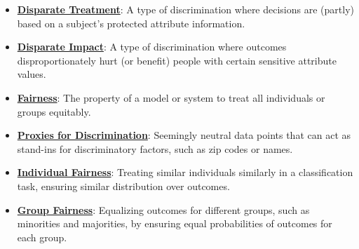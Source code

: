 \documentclass{article}%
\begin{document}
\begin{itemize}[leftmargin=*]%
\item \href{https://purdue.brightspace.com/d2l/common/assets/pdfjs-d2l-dist/1.0.14-legacy/web/viewer.html?file=\%2Fcontent\%2Fenforced\%2F1095467-wl.202510.CS.24300.001\%2F16L2-ethics.pdf\%3Fou\%3D1095467\&lang=en-us\&container=d2l-fileviewer-rendered-pdf\&fullscreen=d2l-fileviewer-rendered-pdf-dialog\&height=667#page=19}{\textbf{Disparate Treatment}}: A type of discrimination where decisions are (partly) based on a subject's protected attribute information.%
\item \href{https://purdue.brightspace.com/d2l/common/assets/pdfjs-d2l-dist/1.0.14-legacy/web/viewer.html?file=\%2Fcontent\%2Fenforced\%2F1095467-wl.202510.CS.24300.001\%2F16L2-ethics.pdf\%3Fou\%3D1095467\&lang=en-us\&container=d2l-fileviewer-rendered-pdf\&fullscreen=d2l-fileviewer-rendered-pdf-dialog\&height=667#page=19}{\textbf{Disparate Impact}}: A type of discrimination where outcomes disproportionately hurt (or benefit) people with certain sensitive attribute values.%
\item \href{https://purdue.brightspace.com/d2l/common/assets/pdfjs-d2l-dist/1.0.14-legacy/web/viewer.html?file=\%2Fcontent\%2Fenforced\%2F1095467-wl.202510.CS.24300.001\%2F16L2-ethics.pdf\%3Fou\%3D1095467\&lang=en-us\&container=d2l-fileviewer-rendered-pdf\&fullscreen=d2l-fileviewer-rendered-pdf-dialog\&height=667#page=2}{\textbf{Fairness}}: The property of a model or system to treat all individuals or groups equitably.%
\item \href{https://purdue.brightspace.com/d2l/common/assets/pdfjs-d2l-dist/1.0.14-legacy/web/viewer.html?file=\%2Fcontent\%2Fenforced\%2F1095467-wl.202510.CS.24300.001\%2F16L2-ethics.pdf\%3Fou\%3D1095467\&lang=en-us\&container=d2l-fileviewer-rendered-pdf\&fullscreen=d2l-fileviewer-rendered-pdf-dialog\&height=667#page=13}{\textbf{Proxies for Discrimination}}: Seemingly neutral data points that can act as stand-ins for discriminatory factors, such as zip codes or names.%
\item \href{https://purdue.brightspace.com/d2l/common/assets/pdfjs-d2l-dist/1.0.14-legacy/web/viewer.html?file=\%2Fcontent\%2Fenforced\%2F1095467-wl.202510.CS.24300.001\%2F16L2-ethics.pdf\%3Fou\%3D1095467\&lang=en-us\&container=d2l-fileviewer-rendered-pdf\&fullscreen=d2l-fileviewer-rendered-pdf-dialog\&height=667#page=27}{\textbf{Individual Fairness}}: Treating similar individuals similarly in a classification task, ensuring similar distribution over outcomes.%
\item \href{https://purdue.brightspace.com/d2l/common/assets/pdfjs-d2l-dist/1.0.14-legacy/web/viewer.html?file=\%2Fcontent\%2Fenforced\%2F1095467-wl.202510.CS.24300.001\%2F16L2-ethics.pdf\%3Fou\%3D1095467\&lang=en-us\&container=d2l-fileviewer-rendered-pdf\&fullscreen=d2l-fileviewer-rendered-pdf-dialog\&height=667#page=26}{\textbf{Group Fairness}}: Equalizing outcomes for different groups, such as minorities and majorities, by ensuring equal probabilities of outcomes for each group.%

\end{itemize}
\end{document}
